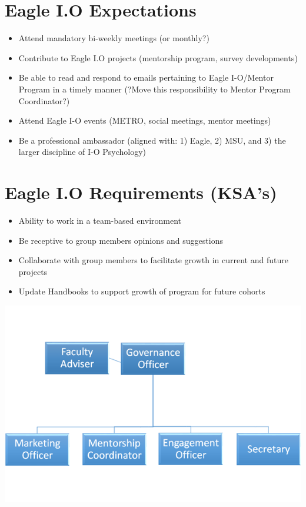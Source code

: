 \documentclass[
]{book}
\providecommand{\tightlist}{%
  \setlength{\itemsep}{0pt}\setlength{\parskip}{0pt}}
\begin{document}
\hypertarget{eagle-i.o-expectations}{%
\section{Eagle I.O Expectations}\label{eagle-i.o-expectations}}

\begin{itemize}
\tightlist
\item
  Attend mandatory bi-weekly meetings (or monthly?)
\item
  Contribute to Eagle I.O projects (mentorship program, survey developments)
\item
  Be able to read and respond to emails pertaining to Eagle I-O/Mentor Program in a timely manner (?Move this responsibility to Mentor Program Coordinator?)
\item
  Attend Eagle I-O events (METRO, social meetings, mentor meetings)
\item
  Be a professional ambassador (aligned with: 1) Eagle, 2) MSU, and 3) the larger discipline of I-O Psychology)
\end{itemize}

\hypertarget{eagle-i.o-requirements-ksas}{%
\section{Eagle I.O Requirements (KSA's)}\label{eagle-i.o-requirements-ksas}}

\begin{itemize}
\tightlist
\item
  Ability to work in a team-based environment
\item
  Be receptive to group members opinions and suggestions
\item
  Collaborate with group members to facilitate growth in current and future projects
\item
  Update Handbooks to support growth of program for future cohorts
\end{itemize}

\includegraphics{images/orgchart.PNG}
\end{document}
